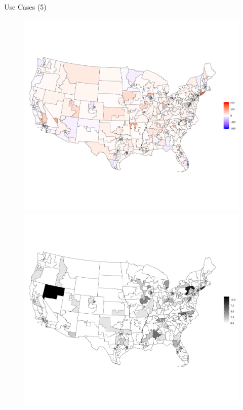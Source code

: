 \begin{frame}{Use Cases (5)}
\begin{figure}[t]
\begin{center}
	\hspace*{-0.1cm}
	\includegraphics[scale=.17]{uc_5_map_editsbefore.png}
	\vspace{0cm} \\
\hspace*{-0.8cm}
	\includegraphics[scale=.17]{uc_5_map_editsanon1.png}
\hspace*{-0.1cm}

\end{center}
\end{figure}
\end{frame}
